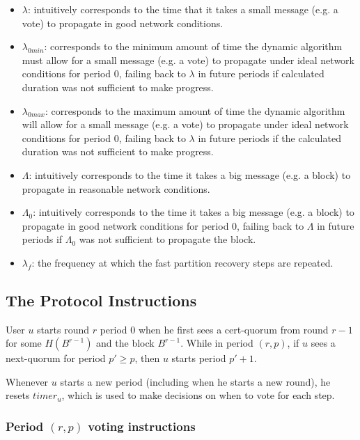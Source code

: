 \documentclass[../main.tex]{subfiles}
\begin{document}
\begin{itemize}

\item $\lambda$: intuitively corresponds to the time that it takes a small message (e.g. a vote) to propagate in good network conditions.

\item $\lambda_{0min}$: corresponds to the minimum amount of time the dynamic algorithm must allow for a small message (e.g. a vote) to propagate under ideal network conditions for period $0$, failing back to $\lambda$ in future periods if calculated duration was not sufficient to make progress.

\item $\lambda_{0max}$: corresponds to the maximum amount of time the dynamic algorithm will allow for a small message (e.g. a vote) to propagate under ideal network conditions for period $0$, failing back to $\lambda$ in future periods if the calculated duration was not sufficient to make progress.

\item $\Lambda$: intuitively corresponds to the time it takes a big message (e.g. a block) to propagate in reasonable network conditions.

\item $\Lambda_0$: intuitively corresponds to the time it takes a big message (e.g. a block) to propagate in good network conditions for period $0$, failing back to $\Lambda$ in future periods if $\Lambda_0$ was not sufficient to propagate the block.

\item $\lambda_f$: the frequency at which the fast partition recovery steps are repeated.

\end{itemize}

\subsection{The Protocol Instructions}
User $u$ starts round $r$ period $0$ when he first sees a cert-quorum from round $r-1$ for some $H(B^{r-1})$ and the block $B^{r-1}$. 
While in period $(r,p)$, if $u$ sees a next-quorum for period $p' \geq p$, then $u$ starts period $p'+1$.

Whenever $u$ starts a new period (including when he starts a new round), he resets $timer_u$, which is used to make decisions on when to vote for each step.

\subsubsection{Period $(r,p)$ voting instructions}
\end{document}
